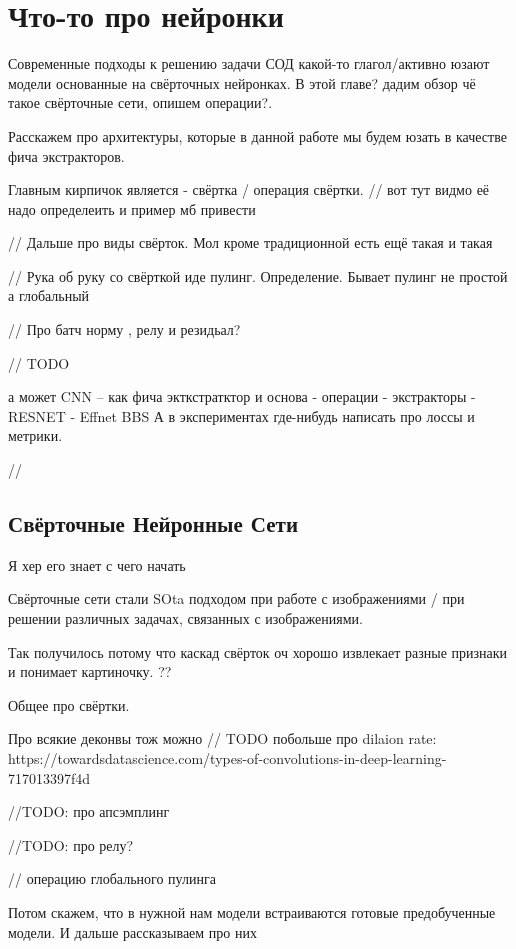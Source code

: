 \section{Что-то про нейронки}

Современные подходы к решению задачи СОД какой-то глагол/активно юзают модели основанные на 
свёрточных нейронках. В этой главе? дадим обзор чё такое  свёрточные сети, опишем операции?. 

Расскажем про архитектуры, которые в данной работе мы будем юзать в качестве фича экстракторов.

Главным кирпичок является - свёртка / операция свёртки.
// вот тут видмо её надо определеить и пример мб привести

// Дальше про виды свёрток. Мол кроме традиционной есть ещё такая и такая  

// Рука об руку со свёрткой иде пулинг. Определение. Бывает пулинг не простой а глобальный

// Про батч норму , релу и резидьал? 


// TODO

а может 
CNN       -- как фича экткстратктор и основа
 - операции
 - экстракторы
    - RESNET
    - Effnet
BBS
А в экспериментах где-нибудь написать про лоссы и метрики.

//

\subsection{Свёрточные Нейронные Сети}

Я хер его знает с чего начать

Свёрточные сети стали SOta подходом при работе с изображениями / при решении различных задачах, связанных с изображениями.

Так получилось потому что каскад свёрток оч хорошо извлекает разные признаки и понимает картиночку. ?? 




Общее про свёртки.

Про всякие деконвы тож можно
// TODO побольше про dilaion rate: https://towardsdatascience.com/types-of-convolutions-in-deep-learning-717013397f4d


//TODO: про апсэмплинг

//TODO: про релу? 

// операцию глобального пулинга

Потом скажем, что в нужной нам модели встраиваются готовые предобученные модели. И дальше рассказываем про них
